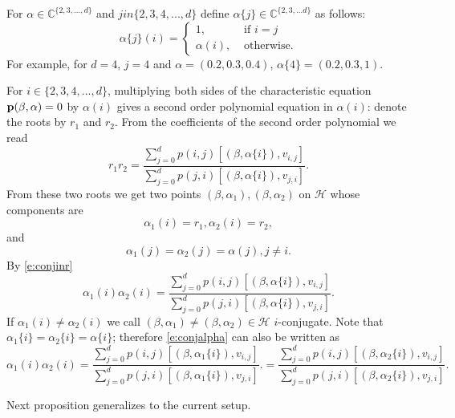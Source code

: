 \documentclass[11pt,a4paper]{article}
\begin{document}
For $\alpha \in {\mathbb C}^{\{2,3,...,d\}}$ and
$j in \{2,3,4,...,d\}$ define
$\alpha\{j\} \in {\mathbb C}^{\{2,3,...d\}}$
as follows: 
\[
\alpha\{j\}(i) = \begin{cases}
 1,&\text{ if } i = j\\
 \alpha(i),&\text{ otherwise.}
\end{cases}
\]
For example, for $d=4$,
$j = 4$
and $\alpha = (0.2,0.3,0.4)$, $\alpha\{4\} = (0.2,0.3,1).$ 


For $i \in \{2,3,4,...,d\}$, multiplying both sides of the characteristic
equation ${\bf p}(\beta,\alpha) =0$
by
$\alpha(i)$
gives a second order polynomial equation in $\alpha(i)$: denote
the roots by $r_1$ and $r_2$. From the coefficients of the second
order polynomial we read
\begin{equation}\label{e:conjinr}
r_1 r_2 = 
\frac{ 
\sum_{j=0}^d p(i,j) [ (\beta, \alpha\{i\}), v_{i,j}]}
{\sum_{j=0}^d p(j,i) [ (\beta, \alpha\{i\}), v_{j,i}]}.
\end{equation}
From these two roots we get two points $(\beta,\alpha_1),
(\beta,\alpha_2)$ on ${\mathcal H}$
whose components are
\[
\alpha_1(i) =r_1, \alpha_2(i)=r_2, 
\]
and
\begin{equation}\label{e:conjugacydg2}
\alpha_1(j) =\alpha_2(j) = \alpha(j), j\neq i.
\end{equation}
By \eqref{e:conjinr}
\begin{equation}\label{e:conjalpha}
\alpha_1(i)\alpha_2(i)
=
\frac{ 
\sum_{j=0}^d p(i,j) [ (\beta, \alpha\{i\}), v_{i,j}]}
{\sum_{j=0}^d p(j,i) [ (\beta, \alpha\{i\}), v_{j,i}]}.
\end{equation}
If $\alpha_1(i)\neq \alpha_2(i)$
we call $(\beta,\alpha_1) \neq (\beta,\alpha_2) \in {\mathcal H}$
$i$-conjugate.
Note that $\alpha_1\{i\} = \alpha_2\{i\} = \alpha\{i\}$; therefore
\eqref{e:conjalpha} can also be written as
\begin{equation}\label{e:conja1toa2}
\alpha_1(i)\alpha_2(i)
=
\frac{ 
\sum_{j=0}^d p(i,j) [ (\beta, \alpha_1\{i\}), v_{i,j}]}
{\sum_{j=0}^d p(j,i) [ (\beta, \alpha_1\{i\}), v_{j,i}]}.
=
\frac{ 
\sum_{j=0}^d p(i,j) [ (\beta, \alpha_2\{i\}), v_{i,j}]}
{\sum_{j=0}^d p(j,i) [ (\beta, \alpha_2\{i\}), v_{j,i}]}.
\end{equation}


Next proposition generalizes \cite[Proposition 4]{sezer2018approximation}
to the current setup. 
\end{document}
